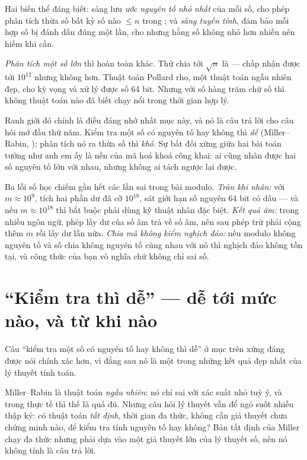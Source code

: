\documentclass[../../algorithm.tex]{subfiles}
\begin{document}
Hai biến thể đáng biết: sàng lưu \emph{ước nguyên tố nhỏ nhất} của mỗi số, cho phép phân tích thừa số bất kỳ số nào \(\le n\) trong ; và \emph{sàng tuyến tính}, đảm bảo mỗi hợp số bị đánh dấu đúng một lần, cho  nhưng hằng số không nhỏ hơn nhiều nên hiếm khi cần.

\emph{Phân tích một số lớn} thì hoàn toàn khác. Thử chia tới \(\sqrt{n}\) là  --- chấp nhận được tới \(10^{12}\) nhưng không hơn. Thuật toán Pollard rho, một thuật toán ngẫu nhiên đẹp, cho kỳ vọng  và xử lý được số 64 bit. Nhưng với số hàng trăm chữ số thì không thuật toán nào đã biết chạy nổi trong thời gian hợp lý.

Ranh giới đó chính là điều đáng nhớ nhất mục này, và nó là câu trả lời cho câu hỏi mở đầu thứ năm. Kiểm tra một số có nguyên tố hay không thì \emph{dễ} (Miller--Rabin, ); phân tích nó ra thừa số thì \emph{khó}. Sự bất đối xứng giữa hai bài toán tưởng như anh em ấy là nền của mã hoá khoá công khai: ai cũng nhân được hai số nguyên tố lớn với nhau, nhưng không ai tách ngược lại được.

\begin{cambay}
Ba lỗi số học chiếm gần hết các lần sai trong bài modulo. \emph{Tràn khi nhân:} với \(m \approx 10^9\), tích hai phần dư đã cỡ \(10^{18}\), sát giới hạn số nguyên 64 bit có dấu --- và nếu \(m \approx 10^{18}\) thì bắt buộc phải dùng kỹ thuật nhân đặc biệt. \emph{Kết quả âm:} trong nhiều ngôn ngữ, phép lấy dư của số âm trả về số âm, nên sau phép trừ phải cộng thêm \(m\) rồi lấy dư lần nữa. \emph{Chia mà không kiểm nghịch đảo:} nếu modulo không nguyên tố và số chia không nguyên tố cùng nhau với nó thì nghịch đảo không tồn tại, và công thức của bạn vô nghĩa chứ không chỉ sai số.
\end{cambay}

\section{``Kiểm tra thì dễ'' --- dễ tới mức nào, và từ khi nào}

Câu ``kiểm tra một số có nguyên tố hay không thì dễ'' ở mục trên xứng đáng được nói chính xác hơn, vì đằng sau nó là một trong những kết quả đẹp nhất của lý thuyết tính toán.

Miller--Rabin là thuật toán \emph{ngẫu nhiên}: nó chỉ sai với xác suất nhỏ tuỳ ý, và trong thực tế thì thế là quá đủ. Nhưng câu hỏi lý thuyết vẫn để ngỏ suốt nhiều thập kỷ: có thuật toán \emph{tất định}, thời gian đa thức, không cần giả thuyết chưa chứng minh nào, để kiểm tra tính nguyên tố hay không? Bản tất định của Miller chạy đa thức nhưng phải dựa vào một giả thuyết lớn của lý thuyết số, nên nó không tính là câu trả lời.
\end{document}
